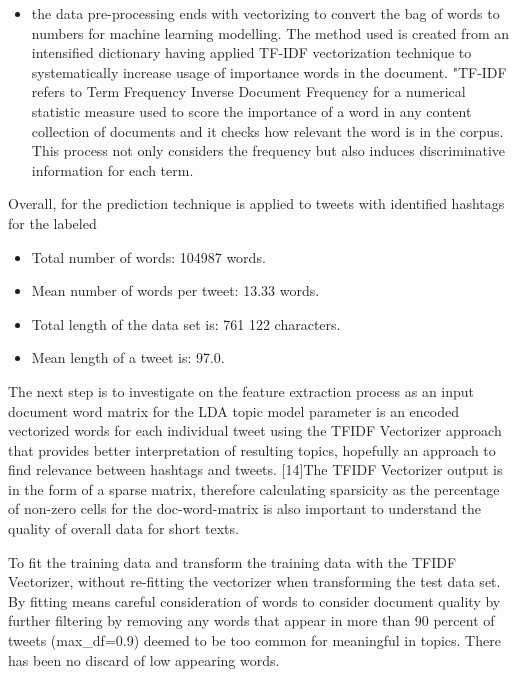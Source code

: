 \begin{itemize}
    \item the data pre-processing ends with vectorizing to convert the bag of words to numbers for machine learning modelling.  The method used is created from an intensified dictionary having applied TF-IDF vectorization technique to systematically increase usage of importance words in the document.  "TF-IDF refers to Term Frequency Inverse Document Frequency for a numerical statistic measure used to score the importance of a word in any content collection of documents and it checks how relevant the word is in the corpus. This process not only considers the frequency but also induces discriminative information for each term.
\end{itemize}

Overall, for the prediction technique is applied to tweets with identified hashtags for the labeled 
\begin{itemize}
    \item Total number of words: 104987 words.
\end{itemize}
\begin{itemize}
    \item Mean number of words per tweet: 13.33 words.
\end{itemize}
\begin{itemize}
    \item Total length of the data set is: 761 122 characters.
\end{itemize}
\begin{itemize}
    \item Mean length of a tweet is: 97.0.
\end{itemize}

The next step is to investigate on the feature extraction process as an input document word matrix for the LDA topic model parameter is an encoded vectorized words for each individual tweet using the TFIDF Vectorizer approach that provides better interpretation of resulting topics, hopefully an approach to find relevance between hashtags and tweets.  [14]The TFIDF Vectorizer output is in the form of a sparse matrix, therefore calculating sparsicity as the percentage of non-zero cells for the doc-word-matrix is also important to understand the quality of overall data for short texts.  

To fit the training data and transform the training data with the TFIDF Vectorizer, without re-fitting the vectorizer when transforming the test data set.  By fitting means careful consideration of words to consider document quality by further filtering by removing any words that appear in more than 90 percent of tweets (max_df=0.9) deemed to be too common for meaningful in topics. There has been no discard of low appearing words.

